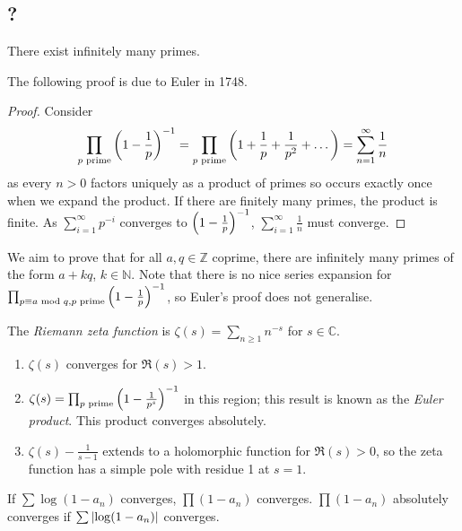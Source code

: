 \subsection{?}
\begin{theorem}[Euclid]
    There exist infinitely many primes.
\end{theorem}
The following proof is due to Euler in 1748.
\begin{proof}
    Consider
    \[ \prod_{p \text{ prime}} \qty(1 - \frac{1}{p})^{-1} = \prod_{p \text{ prime}} \qty(1 + \frac{1}{p} + \frac{1}{p^2} + \dots) = \sum_{n=1}^\infty \frac{1}{n} \]
    as every \( n > 0 \) factors uniquely as a product of primes so occurs exactly once when we expand the product.
    If there are finitely many primes, the product is finite.
    As \( \sum_{i=1}^\infty p^{-i} \) converges to \( \qty(1 - \frac{1}{p})^{-1} \), \( \sum_{i=1}^\infty \frac{1}{n} \) must converge.
\end{proof}
We aim to prove that for all \( a, q \in \mathbb Z \) coprime, there are infinitely many primes of the form \( a + kq \), \( k \in \mathbb N \).
Note that there is no nice series expansion for \( \prod_{p \equiv a \text{ mod } q, p \text{ prime}} \qty(1 - \frac{1}{p})^{-1} \), so Euler's proof does not generalise.
\begin{definition}
    The \emph{Riemann zeta function} is \( \zeta(s) = \sum_{n \geq 1} n^{-s} \) for \( s \in \mathbb C \).
\end{definition}
\begin{proposition}
    \begin{enumerate}
        \item \( \zeta(s) \) converges for \( \Re(s) > 1 \).
        \item \( \zeta(s) = \prod_{p \text{ prime}} \qty(1 - \frac{1}{p^s})^{-1} \) in this region; this result is known as the \emph{Euler product}.
        This product converges absolutely.
        \item \( \zeta(s) - \frac{1}{s - 1} \) extends to a holomorphic function for \( \Re(s) > 0 \), so the zeta function has a simple pole with residue 1 at \( s = 1 \).
    \end{enumerate}
\end{proposition}
If \( \sum \log(1 - a_n) \) converges, \( \prod (1 - a_n) \) converges.
\( \prod (1 - a_n) \) absolutely converges if \( \sum \abs{\log(1-a_n)} \) converges.

